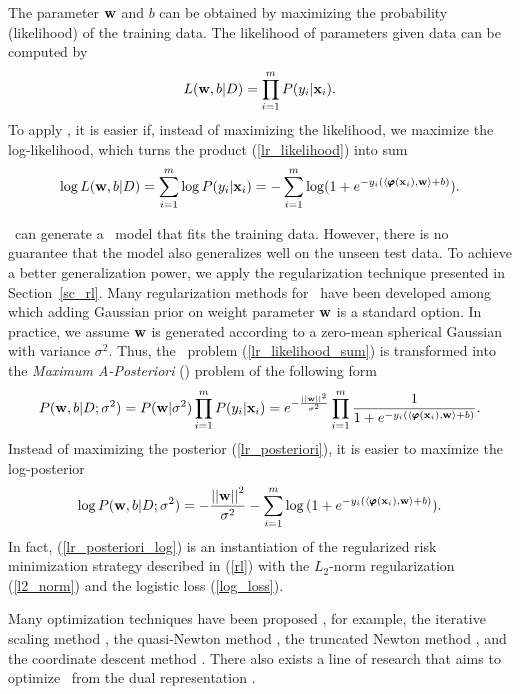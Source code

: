 {%
The parameter $\mathbf {w}$ and $b$ can be obtained by maximizing the probability (likelihood) of the training data.
The likelihood of parameters given data can be computed by
\begin{align}
	L(\mathbf {w},b|D) = \prod_{i=1}^mP(y_i|\mathbf {x}_i). \label{lr_likelihood}
\end{align}
To apply \mle, it is easier if, instead of maximizing the likelihood, we maximize the log-likelihood, which turns the product (\ref{lr_likelihood}) into sum
\begin{align}
	\log L(\mathbf {w},b|D) = \sum_{i=1}^{m}\log P(y_i|\mathbf {x}_i) = -\sum_{i=1}^{m}\log (1+e^{ -y_i(\langle \pmb \varphi(\mathbf {x}_i), \mathbf {w} \rangle+b) }) \label{lr_likelihood_sum}.
\end{align}

\mle\ can generate a \lr\ model that fits the training data.
However, there is no guarantee that the model also generalizes well on the unseen test data.
To achieve a better generalization power, we apply the regularization technique presented in Section~\ref{sc_rl}.
Many regularization methods for \lr\ have been developed \citep{Chen99,Chen00,Goodman03} among which adding Gaussian prior on weight parameter $\mathbf {w}$ is a standard option.
In practice, we assume $\mathbf {w}$ is generated according to a zero-mean spherical Gaussian with variance $\sigma^2$.
Thus, the \mle\ problem (\ref{lr_likelihood_sum}) is transformed into the \textit{Maximum A-Posteriori} (\map) problem of the following form
\begin{align}
	P(\mathbf {w},b|D;\sigma^2) = P(\mathbf {w}|\sigma^2)\prod_{i=1}^mP(y_i|\mathbf {x}_i)=e^{ -\frac{\left|\left| \mathbf {w} \right|\right|^2}{\sigma^2} }\prod_{i=1}^{m}{\frac{1}{1+e^{ -y_i(\langle \pmb \varphi(\mathbf {x}_i), \mathbf {w} \rangle+b) }}}. \label{lr_posteriori}
\end{align}
Instead of maximizing the posterior (\ref{lr_posteriori}), it is easier to maximize the log-posterior
\begin{align}
	\log P(\mathbf {w},b|D;\sigma^2) = -{\frac{\left|\left| \mathbf {w} \right|\right|^2}{\sigma^2}} - \sum_{i=1}^{m}\log{(1+e^{ -y_i(\langle \pmb \varphi(\mathbf {x}_i), \mathbf {w}\rangle+b) })}. \label{lr_posteriori_log}
\end{align}
In fact, (\ref{lr_posteriori_log}) is an instantiation of the regularized risk minimization strategy described in (\ref{rl}) with the $L_2$-norm regularization (\ref{l2_norm}) and the logistic loss (\ref{log_loss}).

Many optimization techniques have been proposed \citep{Minka03}, for example, 
the {iterative scaling} method \citep{Darroch72,Pietra97inducing,Berger97,Goodman02Sequential,Jin03a},
the quasi-Newton method \citep{Minka03},
the truncated Newton method \citep{Komarek05making,Lin2008trust},
and the coordinate descent method \citep{Huang09iterative}.
There also exists a line of research that aims to optimize \lr\ from the dual representation \citep{Jaakkola99probabilistic,Keerthi05a,Yu11dual}.




}

